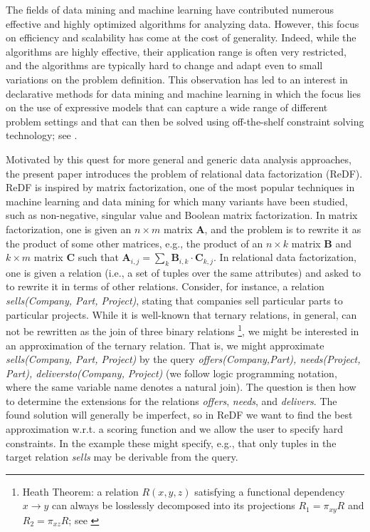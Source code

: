The fields of data mining and machine learning have contributed numerous effective and highly optimized algorithms for analyzing data. 
However, this  focus on efficiency and scalability has come at the cost of generality. 
Indeed, while the algorithms are highly effective, their application range is often very restricted, 
and the algorithms are typically hard to change and adapt even to small variations on the problem definition.
This observation has led to an interest in declarative methods for data mining and machine learning in which the focus lies on 
the use of expressive models that can capture a wide range of different problem settings
and that can then be solved using off-the-shelf constraint solving technology; see \cite{miningZinc,DeRaedtECML12,DMWorkshop,DeRaedtAAAI15}.

Motivated by this quest for more general and generic data analysis approaches, 
the present paper introduces the problem of relational data factorization (ReDF). ReDF is inspired by matrix factorization, one of the most popular techniques in machine learning and data mining
for which many variants have been studied, such as non-negative, singular value and Boolean matrix factorization. 
In matrix factorization, one is given an $n \times m$ matrix $\mathbf{A}$, and the problem is to rewrite it
as the product of some other matrices, e.g., the product of an $n \times  k$ matrix $\mathbf{B}$ and $k\times m$ matrix $\mathbf{C}$
such that ${\mathbf{A}_{i,j} = \sum_k \mathbf{B}_{i,k} \cdot  \mathbf{C}_{k,j}}$.  
In relational data factorization, one is given a relation (i.e., a set of tuples over the same attributes) and asked to
to rewrite it in terms of other relations.  Consider, for instance, a relation
\textit{sells(Company, Part, Project)}, stating that companies sell particular parts to particular projects.
While it is well-known that ternary relations, in general, can not be rewritten
as the join of three binary relations \citep{heath_theorem, ternary_decomposition}\footnote{Heath Theorem: a relation $R(x,y,z)$ satisfying a functional dependency $x \rightarrow y$ can always be losslessly decomposed into its projections $R_1=\pi_{xy}R$ and $R_2=\pi_{xz}R$; see \citep[Table 5]{ternary_decomposition}}, we might be interested in an approximation of 
the ternary relation. That is, we might approximate \textit{sells(Company, Part, Project)} 
by the query \textit{offers(Company,Part), needs(Project, Part), deliversto(Company,} \textit{Project)} (we follow logic programming notation, where the same variable name denotes a natural join).
The question is then how to determine the extensions for the relations \textit{offers}, \textit{needs}, and \textit{delivers}.
The found solution will generally be imperfect, so in ReDF we want to find the best approximation w.r.t. a scoring function and we allow the user to specify hard constraints. In the example these might specify, e.g., that only tuples in the target relation \textit{sells} may be derivable from the query. 

